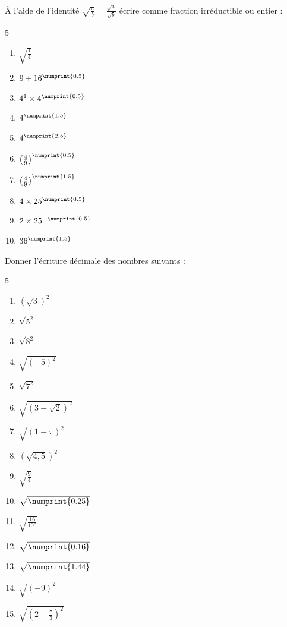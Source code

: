 \begin{exercise}[\cancel{\faCalculator}]  À l'aide de l'identité $\sqrt{\tfrac{a}{b}}=\tfrac{\sqrt{a}}{\sqrt{b}}$ écrire comme fraction irréductible ou entier :
	\begin{multicols}{5} 
		\begin{enumerate}[label={\alph*)\rule{0pt}{1.8em}},leftmargin=*]
			\item  $\sqrt{\tfrac{1}{4}}$
			\item $9+16^{\numprint{0.5}}$
			\item $4^1\times 4^{\numprint{0.5}}$
			\item $4^{\numprint{1.5}}$
			\item $4^{\numprint{2.5}}$
			\item $\left(\tfrac{4}{9}\right)^{\numprint{0.5}}$
			\item $\left(\tfrac{4}{9}\right)^{\numprint{1.5}}$
			\item $4\times 25^{\numprint{0.5}}$
			\item $2\times 25^{-\numprint{0.5}}$ 
			\item $36^{\numprint{1.5}}$
		\end{enumerate}
	\end{multicols}	
\end{exercise}
\begin{exercise}[\cancel{\faCalculator}] Donner l'écriture décimale des nombres suivants :
	\begin{multicols}{5} 
		\begin{enumerate}[label={\alph*)\rule{0pt}{1.8em}},leftmargin=*]
			\item  $(\sqrt{3})^2$
			\item $\sqrt{5^2}$			
			\item $\sqrt{8^2}$
			\item $\sqrt{(-5)^2}$	
			\item $\sqrt{7^2}$ 	
			\item $\sqrt{(3-\sqrt{2})^2}$
			\item $\sqrt{(1-\pi)^2}$
			\item $\left(\sqrt{4,5}\right)^2$     		
			\item $\sqrt{\tfrac{9}{4}}$
			\item $\sqrt{\numprint{0.25}}$
			\item $\sqrt{\tfrac{16}{100}}$
			\item $\sqrt{\numprint{0.16}}$
			\item $\sqrt{\numprint{1.44}}$
			\item $\sqrt{\left(-9\right)^2}$  
			\item $\sqrt{\left(2-\tfrac{7}{3}\right)^2}$ 
		\end{enumerate}
	\end{multicols}
\end{exercise}
